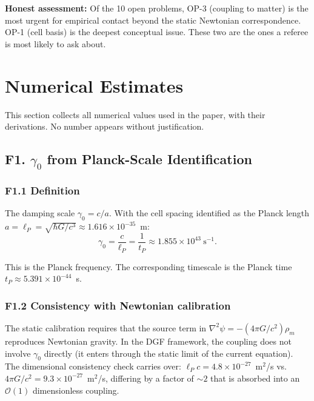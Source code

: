 \documentclass[reprint]{revtex4-2}
\begin{document}
\textbf{Honest assessment:} Of the 10 open problems, OP-3 (coupling to matter) is the most urgent for empirical contact beyond the static Newtonian correspondence. OP-1 (cell basis) is the deepest conceptual issue. These two are the ones a referee is most likely to ask about.

\section{Numerical Estimates}

This section collects all numerical values used in the paper, with their derivations. No number appears without justification.

\subsection{F1. $\gamma_0$ from Planck-Scale Identification}

\subsubsection{F1.1 Definition}

The damping scale $\gamma_0 = c/a$. With the cell spacing identified as the Planck length $a = \ell_P = \sqrt{\hbar G/c^3} \approx 1.616\times 10^{-35}$~m:
\begin{equation}
\boxed{\gamma_0 = \frac{c}{\ell_P} = \frac{1}{t_P} \approx 1.855\times 10^{43}~\text{s}^{-1}}.
\label{eq:gamma0_value}
\end{equation}

This is the Planck frequency. The corresponding timescale is the Planck time $t_P \approx 5.391\times 10^{-44}$~s.

\subsubsection{F1.2 Consistency with Newtonian calibration}

The static calibration requires that the source term in $\nabla^2\psi = -(4\pi G/c^2)\rho_m$ reproduces Newtonian gravity. In the DGF framework, the coupling does not involve $\gamma_0$ directly (it enters through the static limit of the current equation). The dimensional consistency check carries over: $\ell_P c = 4.8\times 10^{-27}$~m$^2$/s vs.\ $4\pi G/c^2 = 9.3\times 10^{-27}$~m$^2$/s, differing by a factor of $\sim 2$ that is absorbed into an $\mathcal{O}(1)$ dimensionless coupling.
\end{document}
